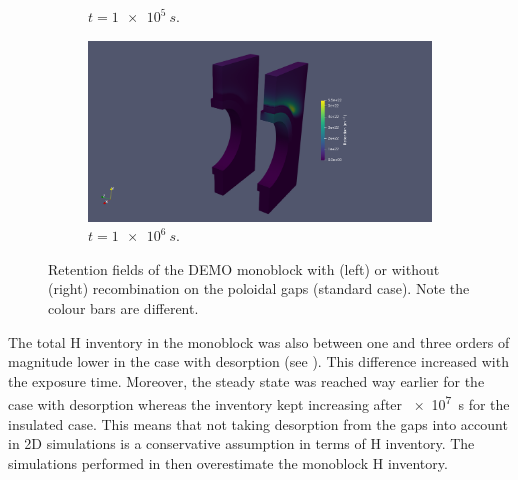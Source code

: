 \begin{figure} [h]
\begin{subfigure}{0.45\linewidth}
        \caption{$t=\SI{1e5}{s}$.}
    \end{subfigure}%
    \qquad
    \begin{subfigure}{0.45\linewidth}
        \centering
        \includegraphics[trim=500 0 300 0, clip, width=\linewidth]{Figures/Chapter3/monoblocks/3D_monoblocks/retention_1e6s.png}
        \caption{$t=\SI{1e6}{s}$.}
    \end{subfigure}
    \caption{Retention fields of the DEMO monoblock with (left) or without (right) recombination on the poloidal gaps (standard case). Note the colour bars are different.}
\end{figure}

The total H inventory in the monoblock was also between one and three orders of magnitude lower in the case with desorption (see ).
This difference increased with the exposure time.
Moreover, the steady state was reached way earlier for the case with desorption whereas the inventory kept increasing after \SI{e7}{s} for the insulated case.
This means that not taking desorption from the gaps into account in 2D simulations is a conservative assumption in terms of H inventory.
The simulations performed in  then overestimate the monoblock H inventory.

